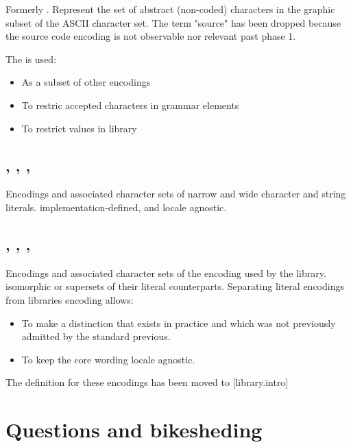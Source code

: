\documentclass{wg21}
\begin{document}
Formerly . Represent the set of abstract (non-coded) characters in the graphic subset of the ASCII character set.
The term "source" has been dropped because the source code encoding is not observable nor relevant past phase 1.

The  is used:
\begin{itemize}
    \item As a subset of other encodings
    \item To restric accepted characters in grammar elements
    \item To restrict values in library
\end{itemize}

\subsection{, , , }

Encodings and associated character sets of narrow and wide character and string literals. implementation-defined, and locale agnostic.



\subsection{, , , }

Encodings and associated character sets of the encoding used by the library. isomorphic or supersets of their literal counterparts.
Separating literal encodings from libraries encoding allows:

\begin{itemize}
    \item To make a distinction that exists in practice and which was not previously admitted by the standard previous.
    \item To keep the core wording locale agnostic.
\end{itemize}

The definition for these encodings has been moved to [library.intro]

\section{Questions and bikesheding}
\end{document}
